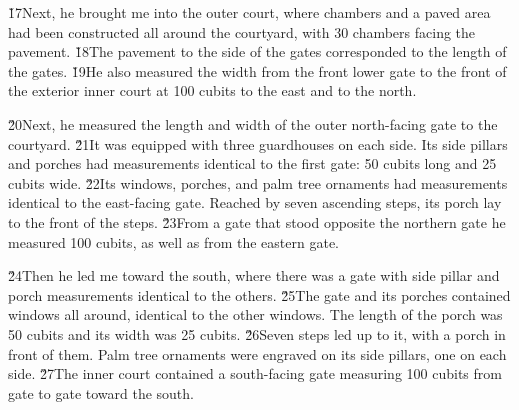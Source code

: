 \v{17}Next, he brought me into the outer court, where chambers and a paved area had been constructed all around the courtyard, with 30 chambers facing the pavement. \v{18}The pavement to the side of the gates corresponded to the length of the gates. \v{19}He also measured the width from the front lower gate to the front of the exterior inner court at 100 cubits to the east and to the north.

\v{20}Next, he measured the length and width of the outer north-facing gate to the courtyard. \v{21}It was equipped with three guardhouses on each side. Its side pillars and porches had measurements identical to the first gate: 50 cubits long and 25 cubits wide. \v{22}Its windows, porches, and palm tree ornaments had measurements identical to the east-facing gate. Reached by seven ascending steps, its porch lay to the front of the steps. \v{23}From a gate that stood opposite the northern gate he measured 100 cubits, as well as from the eastern gate.

\v{24}Then he led me toward the south, where there was a gate with side pillar and porch measurements identical to the others. \v{25}The gate and its porches contained windows all around, identical to the other windows. The length of the porch was 50 cubits and its width was 25 cubits. \v{26}Seven steps led up to it, with a porch in front of them. Palm tree ornaments were engraved on its side pillars, one on each side. \v{27}The inner court contained a south-facing gate measuring 100 cubits from gate to gate toward the south.

